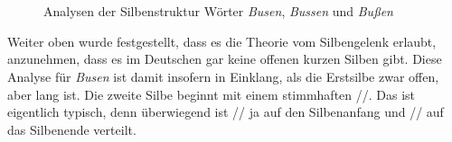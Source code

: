 \begin{figure}
  \centering
  \\
  \vspace{0.5cm}
  \\
  \vspace{0.5cm}
  \caption{Analysen der Silbenstruktur Wörter \textit{Busen}, \textit{Bussen} und \textit{Bußen}}
  \label{fig:busen}
\end{figure}

Weiter oben wurde festgestellt, dass es die Theorie vom Silbengelenk erlaubt, anzunehmen, dass es im Deutschen gar keine offenen kurzen Silben gibt.
Diese Analyse für \textit{Busen} ist damit insofern in Einklang, als die Erstsilbe zwar offen, aber lang ist.
Die zweite Silbe \textipa{[z@n]} beginnt mit einem stimmhaften //.
Das ist eigentlich typisch, denn überwiegend ist // ja auf den Silbenanfang und // auf das Silbenende verteilt.


